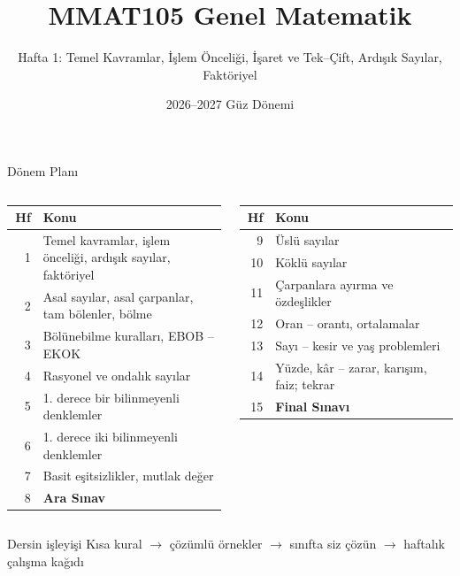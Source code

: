\documentclass[aspectratio=169,11pt]{beamer}
\title[MMAT105 -- Hafta 1]{MMAT105 Genel Matematik}
\subtitle{Hafta 1: Temel Kavramlar, İşlem Önceliği, İşaret ve Tek--Çift, Ardışık Sayılar, Faktöriyel}
\author{}
\date{2026--2027 Güz Dönemi}
\begin{document}
\begin{frame}
\titlepage
\end{frame}


\begin{frame}{Dönem Planı}
\scriptsize
\begin{columns}[t]
\begin{tabular}{@{}r p{0.86\linewidth}@{}}
\toprule
Hf & Konu\\\midrule
1 & Temel kavramlar, işlem önceliği, ardışık sayılar, faktöriyel\\
2 & Asal sayılar, asal çarpanlar, tam bölenler, bölme\\
3 & Bölünebilme kuralları, EBOB -- EKOK\\
4 & Rasyonel ve ondalık sayılar\\
5 & 1. derece bir bilinmeyenli denklemler\\
6 & 1. derece iki bilinmeyenli denklemler\\
7 & Basit eşitsizlikler, mutlak değer\\
8 & \textbf{Ara Sınav}\\\bottomrule
\end{tabular}
\begin{tabular}{@{}r p{0.86\linewidth}@{}}
\toprule
Hf & Konu\\\midrule
9 & Üslü sayılar\\
10 & Köklü sayılar\\
11 & Çarpanlara ayırma ve özdeşlikler\\
12 & Oran -- orantı, ortalamalar\\
13 & Sayı -- kesir ve yaş problemleri\\
14 & Yüzde, kâr -- zarar, karışım, faiz; tekrar\\
15 & \textbf{Final Sınavı}\\\bottomrule
\end{tabular}
\end{columns}
\vspace{6pt}
\begin{block}{Dersin işleyişi}
Kısa kural \(\rightarrow\) çözümlü örnekler \(\rightarrow\) sınıfta siz çözün \(\rightarrow\) haftalık çalışma kağıdı
\end{block}
\end{frame}
\end{document}
